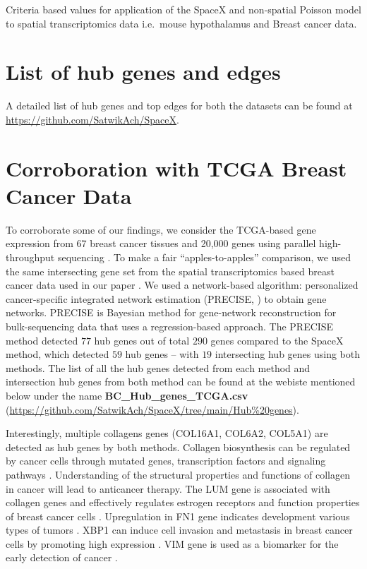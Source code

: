 \documentclass[
]{book}
\begin{document}
\label{tab:BICWAIC} Criteria based values for application of the SpaceX and non-spatial Poisson model to spatial transcriptomics data i.e.~mouse hypothalamus and Breast cancer data.

\hypertarget{list-of-hub-genes-and-edges}{%
\section{List of hub genes and edges}\label{list-of-hub-genes-and-edges}}

A detailed list of hub genes and top edges for both the datasets can be found at \url{https://github.com/SatwikAch/SpaceX}.

\hypertarget{corroboration-with-tcga-breast-cancer-data}{%
\section{Corroboration with TCGA Breast Cancer Data}\label{corroboration-with-tcga-breast-cancer-data}}

To corroborate some of our findings, we consider the TCGA-based gene expression from 67 breast cancer tissues and 20,000 genes using parallel high-throughput sequencing \citep{wirth2011expression, weinstein2013cancer}. To make a fair ``apples-to-apples'' comparison, we used the same intersecting gene set from the spatial transcriptomics based breast cancer data used in our paper \citep{staahl2016visualization}. We used a network-based algorithm: personalized cancer-specific integrated network estimation (PRECISE, \citet{ha2018personalized}) to obtain gene networks. PRECISE is Bayesian method for gene-network reconstruction for bulk-sequencing data that uses a regression-based approach. The PRECISE method detected \(77\) hub genes out of total \(290\) genes compared to the SpaceX method, which detected \(59\) hub genes -- with \(19\) intersecting hub genes using both methods. The list of all the hub genes detected from each method and intersection hub genes from both method can be found at the webiste mentioned below under the name \textbf{BC\_Hub\_genes\_TCGA.csv} (\url{https://github.com/SatwikAch/SpaceX/tree/main/Hub\%20genes}).

Interestingly, multiple collagens genes (COL16A1, COL6A2, COL5A1) are detected as hub genes by both methods. Collagen biosynthesis can be regulated by cancer cells through mutated genes, transcription factors and signaling pathways \citep{xu2019role}. Understanding of the structural properties and functions of collagen in cancer will lead to anticancer therapy. The LUM gene is associated with collagen genes and effectively regulates estrogen receptors and function properties of breast cancer cells \citep{karamanou2017lumican}. Upregulation in FN1 gene indicates development various types of tumors \citep{sun2020high}. XBP1 can induce cell invasion and metastasis in breast cancer cells by promoting high expression \citep{chen2020emerging}. VIM gene
is used as a biomarker for the early detection of cancer \citep{mohebi2020expression}.
\end{document}
